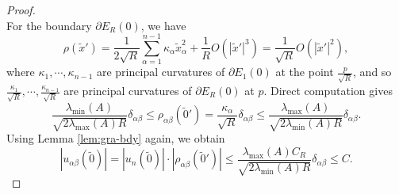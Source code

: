 \documentclass[reqno]{amsart}
\theoremstyle{remark}
\theoremstyle{definition}
\numberwithin{equation}{section}
\begin{document}
\begin{proof}
\begin{equation*}
\end{equation*}
For the boundary $\partial E_R(0)$, we have
\begin{equation}\label{eq:rho}
	\rho(\tilde{x}')=\frac{1}{2\sqrt{R}}\sum_{\alpha=1}^{n-1}\kappa_\alpha \tilde x_\alpha^2+\frac{1}{R}O(|\tilde{x}'|^3)=\frac{1}{\sqrt R}O(|\tilde x'|^2),
\end{equation}
where $\kappa_1,\cdots,\kappa_{n-1}$ are principal curvatures of $\partial E_1(0)$ at the point $\frac{p}{\sqrt R}$, and so $\frac{\kappa_1}{\sqrt R},\cdots,\frac{\kappa_{n-1}}{\sqrt R}$ are principal curvatures of $\partial E_R(0)$ at $p$.  
Direct computation gives 
\[\frac{\lambda_{\text{min}}(A)}{\sqrt{2\lambda_{\text{max}}(A)R}}\delta_{\alpha\beta}\leq\rho_{\alpha\beta}(\tilde 0') =\frac{\kappa_\alpha}{\sqrt R}\delta_{\alpha\beta} \leq \frac{\lambda_{\text{max}}(A)}{\sqrt{2\lambda_{\text{min}}(A)R}}\delta_{\alpha\beta}.\] 
Using Lemma \ref{lem:gra-bdy} again, we obtain
\[
|u_{\alpha\beta}(\tilde 0)| = |u_n(\tilde 0)| \cdot |\rho_{\alpha\beta}(\tilde 0')|\leq\frac{\lambda_{\text{max}}(A)C_R}{\sqrt{2\lambda_{\text{min}}(A)R}}\delta_{\alpha\beta}\leq C.
\]


\end{proof}
\end{document}
